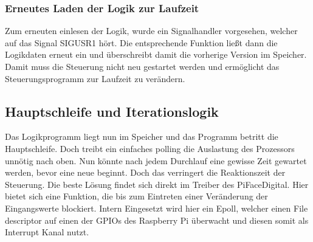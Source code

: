 \subsubsection{Erneutes Laden der Logik zur Laufzeit}\label{kap:ums:reloadConf}
Zum erneuten einlesen der Logik, wurde ein Signalhandler vorgesehen, welcher auf das Signal SIGUSR1 hört. Die entsprechende Funktion ließt dann die Logikdaten erneut ein und überschreibt damit die vorherige Version im Speicher. Damit muss die Steuerung nicht neu gestartet werden und ermöglicht das Steuerungsprogramm zur Laufzeit zu verändern.


\subsection{Hauptschleife und Iterationslogik}\label{kap:ums:mainloop}
Das Logikprogramm liegt nun im Speicher und das Programm betritt die Hauptschleife. Doch treibt ein einfaches polling die Auslastung des Prozessors unnötig nach oben. Nun könnte nach jedem Durchlauf eine gewisse Zeit gewartet werden, bevor eine neue beginnt. Doch das verringert die Reaktionszeit der Steuerung. Die beste Lösung findet sich direkt im Treiber des PiFaceDigital. Hier bietet sich eine Funktion, die bis zum Eintreten einer Veränderung der  Eingangswerte blockiert. Intern Eingesetzt wird hier ein Epoll, welcher einen File descriptor auf einen der GPIOs des Raspberry Pi überwacht und diesen somit als Interrupt Kanal nutzt. 


